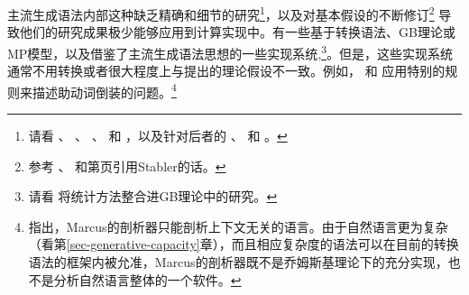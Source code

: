 主流生成语法内部这种缺乏精确和细节的研究\footnote{%
	请看 、 、 、 和 ，以及针对后者的 、 和
   。 
}，以及对基本假设的不断修订\footnote{%
	参考 、  和第\pageref{Zitat-Stabler}页引用Stabler的话。
} 导致他们的研究成果极少能够应用到计算实现中。有一些基于转换语法、GB理论或MP模型，以及借鉴了主流生成语法思想的一些实现系统\citep*{Petrick65a-u,ZFHW65a,Kay67a,Friedman69a,FBDPM71a-u,Morin73a-u,Marcus80a-u,AC86a,Kuhns86a,Correra87a,Stabler87a,Stabler92a-u,Stabler2001a,KT91a,Fong91a-u,CL92a,Lohnstein93a-u,FC94a,Nordgard94a,Veenstra98a,%
FG2012a%
},\footnote{%
  请看 将统计方法整合进GB理论中的研究。
}。但是，这些实现系统通常不用转换或者很大程度上与提出的理论假设不一致。例如， \citet[--104]{Marcus80a-u}和
 \citet[]{Stabler87a}应用特别的规则来描述助动词倒装的问题。\footnote{%
   \citet{NF86a-u,NF87a-u}指出，Marcus的剖析器只能剖析上下文无关的语言。由于自然语言更为复杂（看第\ref{sec-generative-capacity}章），而且相应复杂度的语法可以在目前的转换语法的框架内被允准，Marcus的剖析器既不是乔姆斯基理论下的充分实现，也不是分析自然语言整体的一个软件。
}
